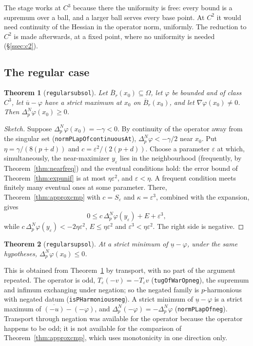 \documentclass[11pt,reqno]{amsart}
\newcommand{\LEANREF}[1]{\texttt{\small\def\_{\textunderscore\allowbreak}#1}}
\newcommand{\eps}{\varepsilon}
\newcommand{\pnlap}{\Delta_p^{N}}
\newcommand{\Op}{T_\eps}
\theoremstyle{plain}
\newtheorem{theorem}{Theorem}[section]
\theoremstyle{definition}
\begin{document}
The stage works at $C^3$ because there the uniformity is free: every bound is a
supremum over a ball, and a larger ball serves every base point. At $C^2$ it
would need continuity of the Hessian in the operator norm, uniformly. The
reduction to $C^2$ is made afterwards, at a fixed point, where no uniformity is
needed (\S\ref{ssec:c2}).

\subsection{The regular case}\label{ssec:regular}

\begin{theorem}[\LEANREF{regular\_subsol}]\label{thm:regsub}
Let $\overline{B}_r(x_0) \subseteq \Omega$, let $\varphi$ be bounded and of
class $C^3$, let $\overline{u} - \varphi$ have a strict maximum at $x_0$ on
$\overline{B}_r(x_0)$, and let $\nabla\varphi(x_0) \ne 0$. Then
$\pnlap\varphi(x_0) \ge 0$.
\end{theorem}

\begin{proof}[Sketch]
Suppose $\pnlap\varphi(x_0) = -\gamma < 0$. By continuity of the operator away
from the singular set (\LEANREF{normPLapOf\_continuousAt}),
$\pnlap\varphi < -\gamma/2$ near $x_0$. Put $\eta = \gamma/(8(p+d))$ and
$c = \eps^2/(2(p+d))$. Choose a parameter $\eps$ at which, simultaneously, the
near-maximizer $y_\eps$ lies in the neighbourhood (frequently, by
Theorem~\ref{thm:nearfreq}) and the eventual conditions hold: the error bound
of Theorem~\ref{thm:expunif} is at most $\eta\eps^2$, and $\eps < \eta$. A
frequent condition meets finitely many eventual ones at some parameter. There,
Theorem~\ref{thm:approxcmp} with $c = S_\eps$ and $\kappa = \eps^3$, combined
with the expansion, gives
\[
  0 \le c\,\pnlap\varphi(y_\eps) + E + \eps^3,
\]
while $c\,\pnlap\varphi(y_\eps) < -2\eta\eps^2$, $E \le \eta\eps^2$ and
$\eps^3 < \eta\eps^2$. The right side is negative.
\end{proof}

\begin{theorem}[\LEANREF{regular\_supsol}]\label{thm:regsup}
At a strict minimum of $\underline{u} - \varphi$, under the same hypotheses,
$\pnlap\varphi(x_0) \le 0$.
\end{theorem}

This is obtained from Theorem~\ref{thm:regsub} by transport, with no part of
the argument repeated. The operator is odd,
$\Op(-v) = -\Op v$ (\LEANREF{tugOfWarOp\_neg}), the supremum and infimum
exchanging under negation; so the negated family is $p$-harmonious with negated
datum (\LEANREF{isPHarmonious\_neg}). A strict minimum of
$\underline{u} - \varphi$ is a strict maximum of
$\overline{(-u)} - (-\varphi)$, and $\pnlap(-\varphi) = -\pnlap\varphi$
(\LEANREF{normPLapOf\_neg}). Transport through negation was available for the
operator because the operator happens to be odd; it is not available for the
comparison of Theorem~\ref{thm:approxcmp}, which uses monotonicity in one
direction only.
\end{document}

